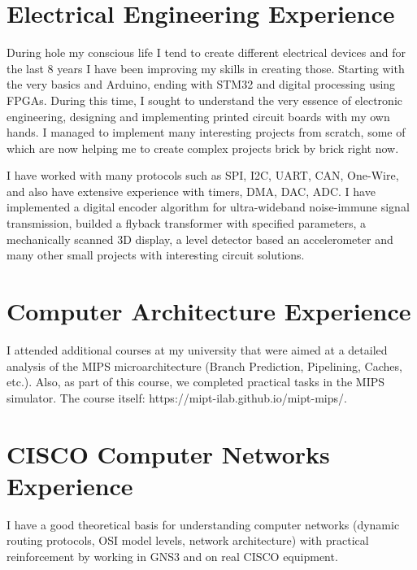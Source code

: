 \documentclass[]{cv-style}          %
\begin{document}

\section{Electrical Engineering Experience}
{\vspace{0.005cm}}
During hole my conscious life I tend to create different electrical devices and for the last 8 years I have been improving my skills in creating those. Starting with the very basics and Arduino, ending with STM32 and digital processing using FPGAs. During this time, I sought to understand the very essence of electronic engineering, designing and implementing printed circuit boards with my own hands. I managed to implement many interesting projects from scratch, some of which are now helping me to create complex projects brick by brick right now.

I have worked with many protocols such as SPI, I2C, UART, CAN, One-Wire, and also have extensive experience with timers, DMA, DAC, ADC. I have implemented a digital encoder algorithm for ultra-wideband noise-immune signal transmission, builded a flyback transformer with specified parameters, a mechanically scanned 3D display, a level detector based an accelerometer and many other small projects with interesting circuit solutions.
\vspace{0.1cm}

\section{Computer Architecture Experience}
{\vspace{0.005cm}}
I attended additional courses at my university that were aimed at a detailed analysis of the MIPS microarchitecture (Branch Prediction, Pipelining, Caches, etc.). Also, as part of this course, we completed practical tasks in the MIPS simulator. The course itself: https://mipt-ilab.github.io/mipt-mips/. 
\vspace{0.1cm}

\section{CISCO Computer Networks Experience}
{\vspace{0.005cm}}
I have a good theoretical basis for understanding computer networks (dynamic routing protocols, OSI model levels, network architecture) with practical reinforcement by working in GNS3 and on real CISCO equipment.
\vspace{0.1cm}
\end{document}
